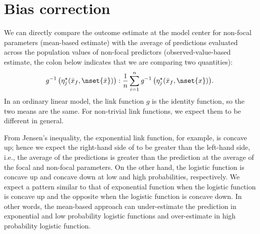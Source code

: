 
\section{Bias correction}

We can directly compare the outcome estimate at the model center for non-focal parameters (mean-based estimate) with the average of predictions evaluated across the population values of non-focal predictors (observed-value-based estimate, the colon below indicates that we are comparing two quantities):
%
\begin{align}\label{eq:compare_anchored_pop_based}
g^{-1} \left(\eta_j^\star(\bar{x}_f, \nset{\bar{x}})\right) : \frac{1}{n} \sum_{i=1}^n{ g^{-1} \left(\eta_j^\star(\bar{x}_f, \nset{x})\right)}.
\end{align}
%
In an ordinary linear model, the link function $g$ is the identity function, so the two means are the same. For non-trivial link functions, we expect them to be different in general.

From Jensen's inequality, the exponential link function, for example, is concave up; hence we expect the right-hand side of  to be greater than the left-hand side, i.e., the average of the predictions is greater than the prediction at the average of the focal and non-focal parameters. On the other hand, the logistic function is concave up and concave down at low and high probabilities, respectively. We expect a pattern similar to that of exponential function when the logistic function is concave up and the opposite when the logistic function is concave down. In other words, the mean-based approach can under-estimate the prediction in exponential and low probability logistic functions and over-estimate in high probability logistic function.



